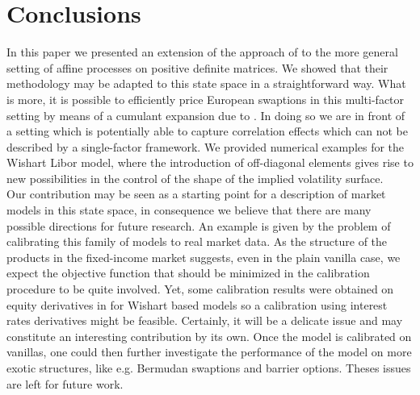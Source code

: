 
\section{Conclusions}
In this paper we presented an extension of the approach of \cite{article_KRPT2009} to the more general setting of affine processes on positive definite matrices. We showed that their methodology may be adapted to this state space in a straightforward way. What is more, it is possible to efficiently price European swaptions in this multi-factor setting by means of a cumulant expansion due to \cite{article_CollinDufresneGoldstein2002}. In doing so we are in front of a setting which is potentially able to capture correlation effects which can not be described by a single-factor framework. We provided numerical examples for the Wishart Libor model, where the introduction of off-diagonal elements gives rise to new possibilities in the control of the shape of the implied volatility surface.\\

Our contribution may be seen as a starting point for a description of market models in this state space, in consequence we believe that there are many possible directions for future research. An example is given by the problem of calibrating this family of models to real market data. As the structure of the products in the fixed-income market suggests, even in the plain vanilla case, we expect the objective function that should be minimized in the calibration procedure to be quite involved. Yet, some calibration results were obtained on equity derivatives in \cite{dafgra11} for Wishart based models so a calibration using interest rates derivatives might be feasible. Certainly, it will be a delicate issue and may constitute an interesting contribution by its own. Once the model is calibrated on vanillas, one could then further investigate the performance of the model on more exotic structures, like e.g. Bermudan swaptions and barrier options. Theses issues are left for future work.

